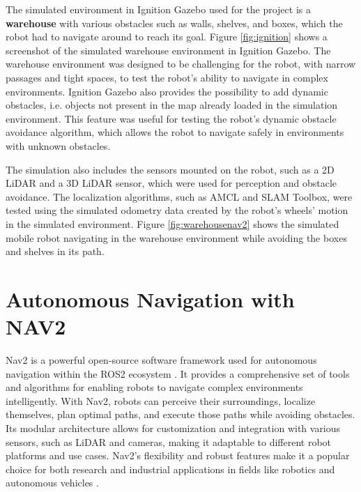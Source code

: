 The simulated environment in Ignition Gazebo used for the project is a \textbf{warehouse}
with various obstacles such as walls, shelves, and boxes, which the robot had to navigate around to reach its goal.
Figure \ref{fig:ignition} shows a screenshot of the simulated warehouse environment in Ignition Gazebo.
The warehouse environment was designed to be challenging
for the robot, with narrow passages and tight spaces, to test the robot's ability to navigate in complex environments.
Ignition Gazebo also provides the possibility to add dynamic obstacles, i.e. objects not present in the map
already loaded in the simulation environment. This feature was useful for testing the robot's dynamic obstacle avoidance
algorithm, which allows the robot to navigate safely in environments with unknown obstacles.

The simulation also includes the sensors mounted on the robot, such as a 2D LiDAR and a 3D LiDAR sensor, which were used
for perception and obstacle avoidance. The localization algorithms, such as AMCL and SLAM Toolbox,
were tested using the simulated odometry data created by the robot's wheels' motion in the simulated environment. Figure 
\ref{fig:warehousenav2} shows the simulated mobile robot navigating in the warehouse environment
while avoiding the boxes and shelves in its path.

\section{Autonomous Navigation with NAV2}
\label{sec:nav2}

Nav2 is a powerful open-source software framework used for autonomous navigation within the ROS2 ecosystem
\cite{macenski2020nav2}.
It provides a comprehensive set of tools and algorithms for enabling robots to navigate complex environments intelligently.
With Nav2, robots can perceive their surroundings, localize themselves, plan optimal paths, and execute 
those paths while avoiding obstacles. Its modular architecture allows for customization and integration with various sensors,
such as LiDAR and cameras, making it adaptable to different robot platforms and use cases. 
Nav2's flexibility and robust features make it a popular choice for both research and industrial applications 
in fields like robotics and autonomous vehicles
\cite{macenski2023survey}.

